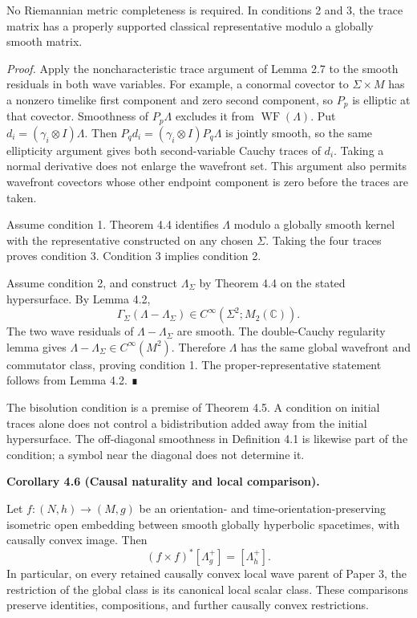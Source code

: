 \documentclass[
  english,
  11pt,
  reqno]{amsart}
\makeatletter
\newcommand{\pandocstatementheading}[1]{%
  \par\addpenalty{\@beginparpenalty}%
  \addvspace{.5\baselineskip plus .2\baselineskip minus .2\baselineskip}%
  {\normalfont\bfseries #1\par}%
  \nobreak\@afterindenttrue\@afterheading
}
\makeatother
\begin{document}
No Riemannian metric completeness is required. In conditions 2 and 3,
the trace matrix has a properly supported classical representative
modulo a globally smooth matrix.

\emph{Proof.} Apply the noncharacteristic trace argument of Lemma 2.7 to
the smooth residuals in both wave variables. For example, a conormal
covector to \(\Sigma\times M\) has a nonzero timelike first component
and zero second component, so \(P_p\) is elliptic at that covector.
Smoothness of \(P_p\Lambda\) excludes it from
\(\operatorname{WF}(\Lambda)\). Put \(d_i=(\gamma_i\otimes I)\Lambda\).
Then \(P_qd_i=(\gamma_i\otimes I)P_q\Lambda\) is jointly smooth, so the
same ellipticity argument gives both second-variable Cauchy traces of
\(d_i\). Taking a normal derivative does not enlarge the wavefront set.
This argument also permits wavefront covectors whose other endpoint
component is zero before the traces are taken.

Assume condition 1. Theorem 4.4 identifies \(\Lambda\) modulo a globally
smooth kernel with the representative constructed on any chosen
\(\Sigma\). Taking the four traces proves condition 3. Condition 3
implies condition 2.

Assume condition 2, and construct \(\Lambda_\Sigma\) by Theorem 4.4 on
the stated hypersurface. By Lemma 4.2, \[
\Gamma_\Sigma(\Lambda-\Lambda_\Sigma)
\in C^\infty(\Sigma^2;M_2(\mathbb C)).
\] The two wave residuals of \(\Lambda-\Lambda_\Sigma\) are smooth. The
double-Cauchy regularity lemma gives
\(\Lambda-\Lambda_\Sigma\in C^\infty(M^2)\). Therefore \(\Lambda\) has
the same global wavefront and commutator class, proving condition 1. The
proper-representative statement follows from Lemma 4.2. ∎

The bisolution condition is a premise of Theorem 4.5. A condition on
initial traces alone does not control a bidistribution added away from
the initial hypersurface. The off-diagonal smoothness in Definition 4.1
is likewise part of the condition; a symbol near the diagonal does not
determine it.

\pandocstatementheading{\protect{}\label{cor:p4-causal-wave-naturality}Corollary 4.6 (Causal naturality and local comparison).}

Let \(f:(N,h)\to(M,g)\) be an orientation- and
time-orientation-preserving isometric open embedding between smooth
globally hyperbolic spacetimes, with causally convex image. Then \[
(f\times f)^*[\Lambda_g^+]=[\Lambda_h^+].
\] In particular, on every retained causally convex local wave parent of
Paper 3, the restriction of the global class is its canonical local
scalar class. These comparisons preserve identities, compositions, and
further causally convex restrictions.
\end{document}
